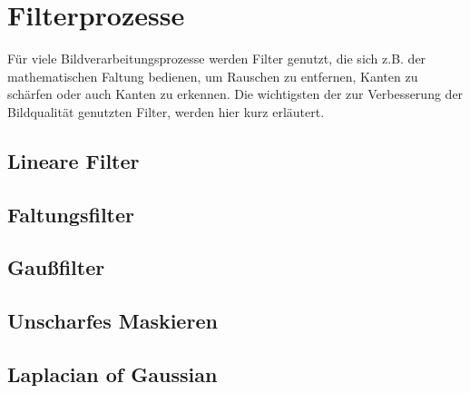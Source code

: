 \section*{Filterprozesse}
\writtenby{\dcauthornameriren}%
Für viele Bildverarbeitungsprozesse werden Filter genutzt, die sich z.B. der mathematischen Faltung bedienen, um Rauschen zu entfernen, Kanten zu schärfen oder auch Kanten zu erkennen. Die wichtigsten der zur Verbesserung der Bildqualität genutzten Filter, werden hier kurz erläutert.

\subsection*{Lineare Filter}

\subsection*{Faltungsfilter}

\subsection*{Gaußfilter}

\subsection*{Unscharfes Maskieren}

\subsection*{Laplacian of Gaussian}
